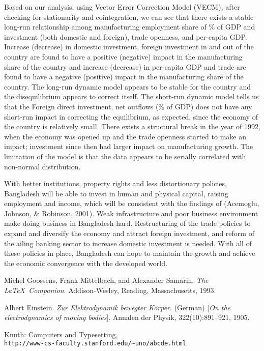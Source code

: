\documentclass[11pt,a4paper]{article}
\begin{document}
\normalsize Based on our analysis, using Vector Error Correction Model (VECM), after checking for stationarity and cointegration, we can see that there exists a stable long-run relationship among manufacturing employment share of \% of GDP and investment (both domestic and foreign), trade openness, and per-capita GDP.
Increase (decrease) in domestic investment, foreign investment in and out of the country are found to have a positive (negative) impact in the manufacturing share of the country and increase (decrease) in per-capita GDP and trade are found to have a negative (positive) impact in the manufacturing share of the country. The long-run dynamic model appears to be stable for the country and the disequilibrium appears to correct itself. The short-run dynamic model tells us that the Foreign direct investment, net outflows (\% of GDP) does not have any short-run impact in correcting the equilibrium, as expected, since the economy of the country is relatively small. There exists a structural break in the year of 1992, when the economy was opened up and the trade openness started to make an impact; investment since then had larger impact on manufacturing growth. The limitation of the model is that the data appears to be serially correlated with non-normal distribution.  \cite{einstein}

With better institutions, property rights and less distortionary policies, Bangladesh will be able to invest in human and physical capital, raising employment and income, which will be consistent with the findings of (Acemoglu, Johnson, \& Robinson, 2001). Weak infrastructure and poor business environment make doing business in Bangladesh hard. Restructuring of the trade policies to expand and diversify the economy and attract foreign investment, and reform of the ailing banking sector to increase domestic investment is needed. With all of these policies in place, Bangladesh can hope to maintain the growth and achieve the economic convergence with the developed world. \cite{latexcompanion}

\newpage

\begin{thebibliography}{9}
Michel Goossens, Frank Mittelbach, and Alexander Samarin. 
\textit{The \LaTeX\ Companion}. 
Addison-Wesley, Reading, Massachusetts, 1993.

Albert Einstein. 
\textit{Zur Elektrodynamik bewegter K{\"o}rper}. (German) 
[\textit{On the electrodynamics of moving bodies}]. 
Annalen der Physik, 322(10):891–921, 1905.

Knuth: Computers and Typesetting,
\\\texttt{http://www-cs-faculty.stanford.edu/\~{}uno/abcde.html}
\end{thebibliography}
\end{document}
